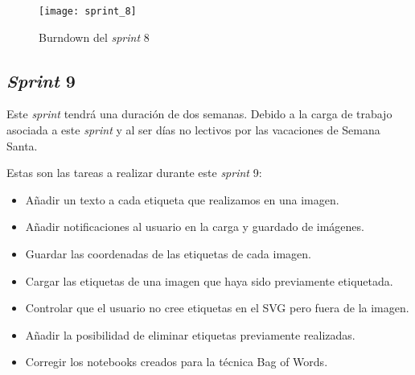 \begin{figure}[h]
\centering
\texttt{[image: sprint\_8]}
\caption{Burndown del \textit{sprint} 8}
\label{fig:A.1.9}
\end{figure}

\subsection{\textit{Sprint} 9}

Este \textit{sprint} tendrá una duración de dos semanas. Debido  a la carga de trabajo asociada a este \textit{sprint} y al ser días no lectivos por las vacaciones de Semana Santa. 

Estas son las tareas a realizar durante este \textit{sprint} 9:

\begin{itemize}
	\item Añadir un texto a cada etiqueta que realizamos en una imagen.
	\item Añadir notificaciones al usuario en la carga y guardado de imágenes.
	\item Guardar las coordenadas de las etiquetas de cada imagen.
	\item Cargar las etiquetas de una imagen que haya sido previamente etiquetada.
	\item Controlar que el usuario no cree etiquetas en el SVG pero fuera de la imagen.
	\item Añadir la posibilidad de eliminar etiquetas previamente realizadas.
	\item Corregir los notebooks creados para la técnica Bag of Words.
\end{itemize}


\begin{comment}
\begin{figure}[h]
\centering
\texttt{[image: sprint\_9]}
\caption{Burndown del \textit{sprint} 9}
\label{fig:A.1.10}
\end{figure}
\end{comment}

\begin{comment}

\section{Estudio de viabilidad}

\subsection{Viabilidad económica}

\subsection{Viabilidad legal}
\end{comment}

